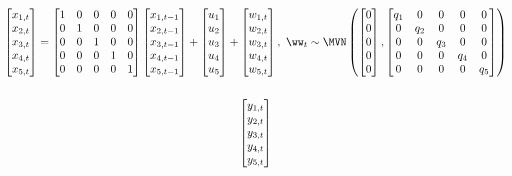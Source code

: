 \begin{gather*}
\begin{bmatrix}x_{1,t}\\x_{2,t}\\x_{3,t}\\x_{4,t}\\x_{5,t}\end{bmatrix}
= \begin{bmatrix}1&0&0&0&0\\0&1&0&0&0\\0&0&1&0&0\\0&0&0&1&0\\0&0&0&0&1\end{bmatrix}
\begin{bmatrix}x_{1,t-1}\\x_{2,t-1}\\x_{3,t-1}\\x_{4,t-1}\\x_{5,t-1}\end{bmatrix}
+ \begin{bmatrix}u_1\\u_2\\u_3\\u_4\\u_5\end{bmatrix}
+ \begin{bmatrix}w_{1,t}\\w_{2,t}\\w_{3,t}\\w_{4,t}\\w_{5,t}\end{bmatrix},
 \textrm{ } \ww_t \sim \MVN\begin{pmatrix}\begin{bmatrix}0\\0\\0\\0\\0\end{bmatrix},\begin{bmatrix}q_1&0&0&0&0\\0&q_2&0&0&0\\0&0&q_3&0&0\\0&0&0&q_4&0\\0&0&0&0&q_5\end{bmatrix} \end{pmatrix}  \\
\\
\begin{bmatrix}y_{1,t}\\y_{2,t}\\y_{3,t}\\y_{4,t}\\y_{5,t}\end{bmatrix}

\end{gather*}
